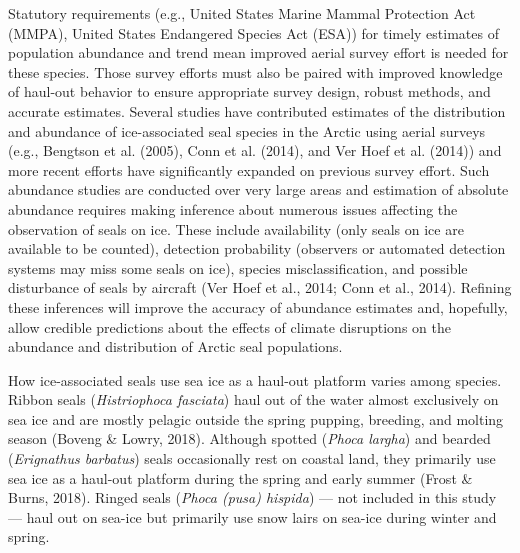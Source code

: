 \documentclass[fleqn,10pt,lineno]{wlpeerj} %
\begin{document}
Statutory requirements (e.g., United States Marine Mammal Protection Act (MMPA),
United States Endangered Species Act (ESA)) for timely estimates of population
abundance and trend mean improved aerial survey effort is needed for these
species. Those survey efforts must also be paired with improved knowledge of
haul-out behavior to ensure appropriate survey design, robust methods, and
accurate estimates. Several studies have contributed estimates of the
distribution and abundance of ice-associated seal species in the Arctic using
aerial surveys (e.g.,
Bengtson et al. (2005), Conn et al. (2014), and Ver Hoef et al. (2014)) and more recent efforts have
significantly expanded on previous survey effort. Such abundance studies are
conducted over very large areas and estimation of absolute abundance requires
making inference about numerous issues affecting the observation of seals on
ice. These include availability (only seals on ice are available to be counted),
detection probability (observers or automated detection systems may miss some
seals on ice), species misclassification, and possible disturbance of seals by
aircraft (Ver Hoef et al., 2014; Conn et al., 2014). Refining these inferences will improve the
accuracy of abundance estimates and, hopefully, allow credible predictions about
the effects of climate disruptions on the abundance and distribution of Arctic
seal populations.

How ice-associated seals use sea ice as a haul-out platform varies among
species. Ribbon seals (\emph{Histriophoca fasciata}) haul out of the water almost
exclusively on sea ice and are mostly pelagic outside the spring pupping,
breeding, and molting season (Boveng \& Lowry, 2018). Although spotted (\emph{Phoca largha})
and bearded (\emph{Erignathus barbatus}) seals occasionally rest on coastal land,
they primarily use sea ice as a haul-out platform during the spring and early
summer (Frost \& Burns, 2018). Ringed seals (\emph{Phoca (pusa) hispida}) --- not included in this
study --- haul out on sea-ice but primarily use snow lairs on sea-ice during
winter and spring.
\end{document}
